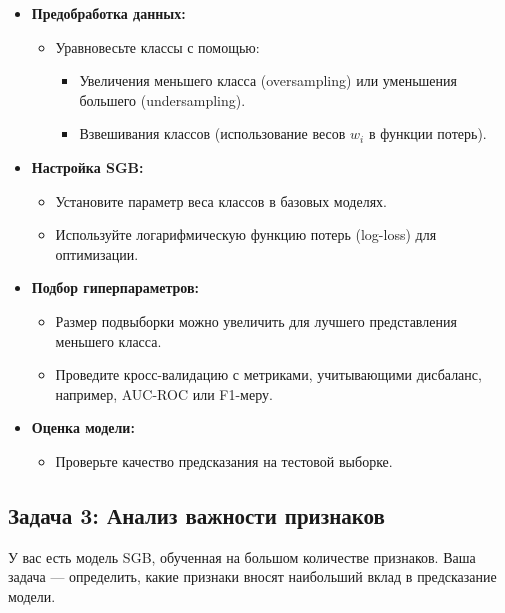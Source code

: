 \begin{itemize}
    \item \textbf{Предобработка данных:}
          \begin{itemize}
              \item Уравновесьте классы с помощью:
                    \begin{itemize}
                        \item Увеличения меньшего класса (oversampling) или уменьшения большего (undersampling).
                        \item Взвешивания классов (использование весов $w_i$ в функции потерь).
                    \end{itemize}
          \end{itemize}
    \item \textbf{Настройка SGB:}
          \begin{itemize}
              \item Установите параметр веса классов в базовых моделях.
              \item Используйте логарифмическую функцию потерь (log-loss) для оптимизации.
          \end{itemize}
    \item \textbf{Подбор гиперпараметров:}
          \begin{itemize}
              \item Размер подвыборки можно увеличить для лучшего представления меньшего класса.
              \item Проведите кросс-валидацию с метриками, учитывающими дисбаланс, например, AUC-ROC или F1-меру.
          \end{itemize}
    \item \textbf{Оценка модели:}
          \begin{itemize}
              \item Проверьте качество предсказания на тестовой выборке.
          \end{itemize}
\end{itemize}

\subsection{Задача 3: Анализ важности признаков}

У вас есть модель SGB, обученная на большом количестве признаков. Ваша задача — определить, какие признаки вносят наибольший вклад в предсказание модели.

